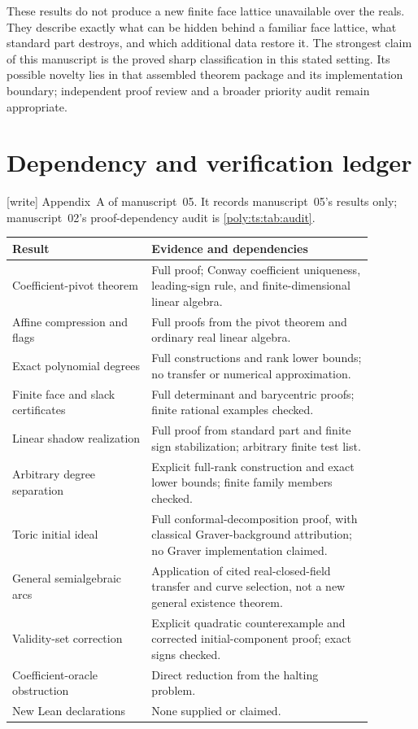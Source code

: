 \documentclass[11pt,a4paper]{article}
\numberwithin{equation}{section}
\theoremstyle{plain}
\newcommand{\wtag}{\textup{[write]}}%
\begin{document}
These results do not produce a new finite face lattice unavailable over
the reals. They describe exactly what can be hidden behind a familiar
face lattice, what standard part destroys, and which additional data
restore it. The strongest claim of this manuscript is the proved sharp
classification in this stated setting. Its possible novelty lies in that
assembled theorem package and its implementation boundary; independent
proof review and a broader priority audit remain appropriate.

\section{Dependency and verification ledger}
\noindent\wtag{} Appendix~A of manuscript~05. It records manuscript~05's
results only; manuscript~02's proof-dependency audit is
\cref{poly:ts:tab:audit}.

\begin{center}
\small
\begin{longtable}{@{}p{0.34\linewidth}p{0.54\linewidth}@{}}
\toprule
Result & Evidence and dependencies\\
\midrule
\endhead
Coefficient-pivot theorem & Full proof; Conway coefficient uniqueness,
 leading-sign rule, and finite-dimensional linear algebra.\\
Affine compression and flags & Full proofs from the pivot theorem and
 ordinary real linear algebra.\\
Exact polynomial degrees & Full constructions and rank lower bounds;
 no transfer or numerical approximation.\\
Finite face and slack certificates & Full determinant and barycentric
 proofs; finite rational examples checked.\\
Linear shadow realization & Full proof from standard part and finite
 sign stabilization; arbitrary finite test list.\\
Arbitrary degree separation & Explicit full-rank construction and exact
 lower bounds; finite family members checked.\\
Toric initial ideal & Full conformal-decomposition proof, with classical
 Graver-background attribution; no Graver implementation claimed.\\
General semialgebraic arcs & Application of cited real-closed-field
 transfer and curve selection, not a new general existence theorem.\\
Validity-set correction & Explicit quadratic counterexample and corrected
 initial-component proof; exact signs checked.\\
Coefficient-oracle obstruction & Direct reduction from the halting problem.\\
New Lean declarations & None supplied or claimed.\\
\bottomrule
\end{longtable}
\end{center}
\end{document}
